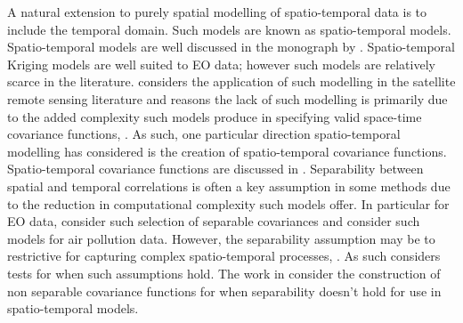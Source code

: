 A natural extension to purely spatial modelling of spatio-temporal data is to include the temporal domain.
Such models are known as spatio-temporal models.
Spatio-temporal models are well discussed in the monograph \cite{cressie_statistics_2011} by \citeauthor{cressie_statistics_2011}.
Spatio-temporal Kriging models are well suited to EO data; however such models are relatively scarce in the literature.
\citeauthor{militino_introduction_2018} considers the application of such modelling in the satellite remote sensing literature and reasons the lack of such modelling is primarily due to the added complexity such models produce in specifying valid space-time covariance functions, \cite{militino_introduction_2018}.
As such, one particular direction spatio-temporal modelling has considered is the creation of spatio-temporal covariance functions.
Spatio-temporal covariance functions are discussed in \citep{cressie_statistics_2011}.
Separability between spatial and temporal correlations is often a key assumption in some methods due to the reduction in computational complexity such models offer.
In particular for EO data, \cite{george_selecting_2015} consider such selection of separable covariances and \cite{deb_spatio-temporal_2017} consider such models for air pollution data. 
However, the separability assumption may be to restrictive for capturing complex spatio-temporal processes, \citep{cressie_statistics_2011}. 
As such \citep{mitchell_likelihood_2006, fuentes_testing_2006, aston_tests_2017} considers tests for when such assumptions hold.
The work in \citep{cressie_classes_1999, gneiting_nonseparable_2002, iaco_nonseparable_2002} consider the construction of non separable covariance functions for when separability doesn't hold for use in spatio-temporal models.

